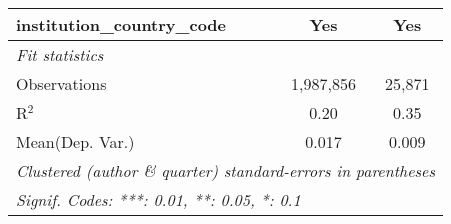 \begin{tabular}{lcc}
   institution\_country\_code                                 & Yes            & Yes\\  
   \midrule
   \emph{Fit statistics}\\
   Observations                                               & 1,987,856      & 25,871\\  
   R$^2$                                                      & 0.20           & 0.35\\  
Mean(Dep. Var.) & 0.017 & 0.009 \\
   \midrule \midrule
   \multicolumn{3}{l}{\emph{Clustered (author \& quarter) standard-errors in parentheses}}\\
   \multicolumn{3}{l}{\emph{Signif. Codes: ***: 0.01, **: 0.05, *: 0.1}}\\
\end{tabular}
\par\endgroup
